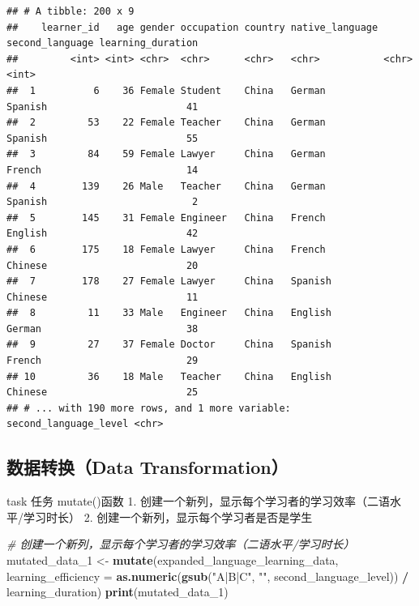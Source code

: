 \documentclass[]{book}
\newenvironment{Shaded}{\begin{snugshade}}{\end{snugshade}}
\newcommand{\CommentTok}[1]{\textcolor[rgb]{0.56,0.35,0.01}{\textit{#1}}}
\newcommand{\DataTypeTok}[1]{\textcolor[rgb]{0.13,0.29,0.53}{#1}}
\newcommand{\DecValTok}[1]{\textcolor[rgb]{0.00,0.00,0.81}{#1}}
\newcommand{\KeywordTok}[1]{\textcolor[rgb]{0.13,0.29,0.53}{\textbf{#1}}}
\newcommand{\NormalTok}[1]{#1}
\newcommand{\OperatorTok}[1]{\textcolor[rgb]{0.81,0.36,0.00}{\textbf{#1}}}
\newcommand{\StringTok}[1]{\textcolor[rgb]{0.31,0.60,0.02}{#1}}
\begin{document}
\begin{verbatim}
## # A tibble: 200 x 9
##    learner_id   age gender occupation country native_language second_language learning_duration
##         <int> <int> <chr>  <chr>      <chr>   <chr>           <chr>                       <int>
##  1          6    36 Female Student    China   German          Spanish                        41
##  2         53    22 Female Teacher    China   German          Spanish                        55
##  3         84    59 Female Lawyer     China   German          French                         14
##  4        139    26 Male   Teacher    China   German          Spanish                         2
##  5        145    31 Female Engineer   China   French          English                        42
##  6        175    18 Female Lawyer     China   French          Chinese                        20
##  7        178    27 Female Lawyer     China   Spanish         Chinese                        11
##  8         11    33 Male   Engineer   China   English         German                         38
##  9         27    37 Female Doctor     China   Spanish         French                         29
## 10         36    18 Male   Teacher    China   English         Chinese                        25
## # ... with 190 more rows, and 1 more variable: second_language_level <chr>
\end{verbatim}

\hypertarget{ux6570ux636eux8f6cux6362data-transformation}{%
\subsection{数据转换（Data Transformation）}\label{ux6570ux636eux8f6cux6362data-transformation}}

\begin{infobox}task
任务
mutate()函数
1. 创建一个新列，显示每个学习者的学习效率（二语水平/学习时长）
2. 创建一个新列，显示每个学习者是否是学生

\end{infobox}

\begin{Shaded}
\begin{Highlighting}[]
\CommentTok{# 创建一个新列，显示每个学习者的学习效率（二语水平/学习时长）}
\NormalTok{mutated_data_}\DecValTok{1}\NormalTok{ <-}\StringTok{ }\KeywordTok{mutate}\NormalTok{(expanded_language_learning_data, }\DataTypeTok{learning_efficiency =} \KeywordTok{as.numeric}\NormalTok{(}\KeywordTok{gsub}\NormalTok{(}\StringTok{"A|B|C"}\NormalTok{, }\StringTok{""}\NormalTok{, second_language_level)) }\OperatorTok{/}\StringTok{ }\NormalTok{learning_duration)}
\KeywordTok{print}\NormalTok{(mutated_data_}\DecValTok{1}\NormalTok{)}
\end{Highlighting}
\end{Shaded}
\end{document}
